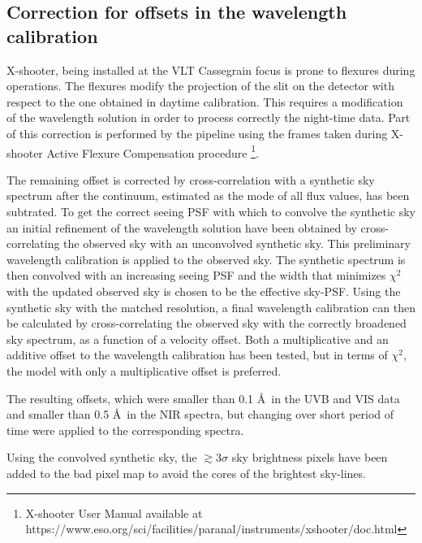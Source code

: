 \documentclass{aa}    %
\begin{document}
\subsection{Correction for offsets in the wavelength calibration}    \label{wavecal}

X-shooter, being installed at the VLT Cassegrain focus is  prone to flexures
during operations. The flexures modify the projection of the slit on the
detector with respect to the one obtained in daytime calibration. This requires a
modification of the wavelength solution in order to process correctly the
night-time data. Part of this correction is performed by the pipeline using the
frames taken during X-shooter Active Flexure Compensation procedure
\footnote{X-shooter User Manual available at
	https://www.eso.org/sci/facilities/paranal/instruments/xshooter/doc.html}.

The remaining offset is corrected by cross-correlation with a synthetic sky
spectrum \citep{Noll2012, Jones2013} after the continuum, estimated as the mode
of all flux values, has been subtrated. To get the correct seeing PSF with which
to convolve the synthetic sky an initial refinement of the wavelength solution
have been obtained by cross-correlating the observed sky with an unconvolved
synthetic sky. This preliminary wavelength calibration is applied to the
observed sky. The synthetic spectrum is then convolved with an increasing seeing
PSF and the width that minimizes $\chi^2$ with the updated observed sky is
chosen to be the effective sky-PSF. Using the synthetic sky with the matched
resolution, a final wavelength calibration can then be calculated by
cross-correlating the observed sky with the correctly broadened sky spectrum, as
a function of a velocity offset. Both a multiplicative and an additive offset to
the wavelength calibration has been tested, but in terms of $\chi^2$, the model
with only a multiplicative offset is preferred.

The resulting offsets, which were smaller than 0.1 \AA~in the UVB and VIS data
and smaller than 0.5 \AA~in the NIR spectra, but changing over short period of
time were applied to the corresponding spectra.

Using the convolved synthetic sky, the $\gtrsim 3 \sigma$ sky brightness pixels
have been added to the bad pixel map to avoid the cores of the brightest
sky-lines.

\end{document}

